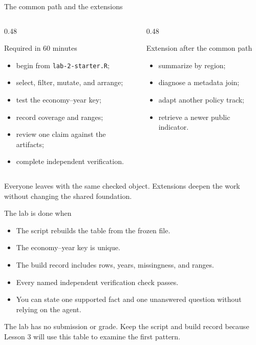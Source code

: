 \begin{frame}{The common path and the extensions}
  \begin{columns}[T,onlytextwidth]
    \begin{column}{0.48\textwidth}
      \begin{block}{Required in 60 minutes}
        \begin{itemize}
          \item begin from \texttt{lab-2-starter.R};
          \item select, filter, mutate, and arrange;
          \item test the economy--year key;
          \item record coverage and ranges;
          \item review one claim against the artifacts;
          \item complete independent verification.
        \end{itemize}
      \end{block}
    \end{column}
    \begin{column}{0.48\textwidth}
      \begin{block}{Extension after the common path}
        \begin{itemize}
          \item summarize by region;
          \item diagnose a metadata join;
          \item adapt another policy track;
          \item retrieve a newer public indicator.
        \end{itemize}
      \end{block}
    \end{column}
  \end{columns}

  \vfill
  Everyone leaves with the same checked object. Extensions deepen the work
  without changing the shared foundation.
\end{frame}

\begin{frame}{The lab is done when}
  \begin{itemize}
    \item The script rebuilds the table from the frozen file.
    \item The economy--year key is unique.
    \item The build record includes rows, years, missingness, and ranges.
    \item Every named independent verification check passes.
    \item You can state one supported fact and one unanswered question without
      relying on the agent.
  \end{itemize}

  \vfill
  The lab has no submission or grade. Keep the script and build record because
  Lesson 3 will use this table to examine the first pattern.
\end{frame}

